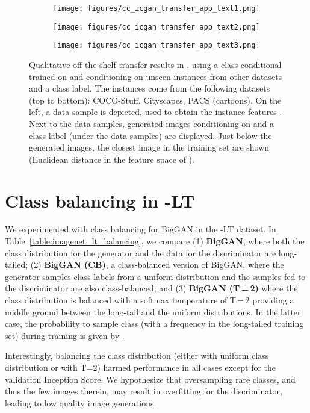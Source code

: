  \begin{figure}
\centering
\begin{subfigure}{1\textwidth}
 \centering
\texttt{[image: figures/cc\_icgan\_transfer\_app\_text1.png]}
\end{subfigure}
\begin{subfigure}{1\textwidth}
 \centering
\texttt{[image: figures/cc\_icgan\_transfer\_app\_text2.png]}
\end{subfigure}
\begin{subfigure}{1\textwidth}
 \centering
\texttt{[image: figures/cc\_icgan\_transfer\_app\_text3.png]}
\end{subfigure}
\caption{Qualitative off-the-shelf transfer results in , using a class-conditional \ours trained on \ImNet and conditioning on unseen instances from other datasets and a class label. The instances come from the following datasets (top to bottom): COCO-Stuff, Cityscapes, PACS (cartoons).
On the left, a data sample  is depicted, used to obtain the instance features . Next to the data samples, generated images conditioning on  and a class label (under the data samples) are displayed. Just below the generated images, the closest image in the \ImNet training set are shown (Euclidean distance in the feature space of ).
}
\label{fig:cc_icgan_transfer_app}
\end{figure}

\section{Class balancing in \ImNet-LT}
\label{app:class_balacing}
We experimented with class balancing for BigGAN in the \ImNet-LT dataset.
In Table~\ref{table:imagenet_lt_balancing}, we compare (1) \textbf{BigGAN}, where both the class distribution for the generator and the data for the discriminator are long-tailed; (2) \textbf{BigGAN (CB)}, a class-balanced version of BigGAN, where the generator samples class labels from a uniform distribution and the samples fed to the discriminator are also class-balanced; and (3) \textbf{BigGAN (T\,=\,2)} where the class distribution is balanced with a softmax temperature of T\,=\,2 providing a middle ground between the long-tail and the uniform distributions. In the latter case, the probability to sample class  (with a frequency  in the long-tailed training set) during training is given by .

Interestingly, balancing the class distribution (either with uniform class distribution or with T=2) harmed performance in all cases except for the validation Inception Score. We hypothesize that oversampling rare classes, and thus the few images therein, may result in overfitting for the discriminator, leading to low quality image generations. 

